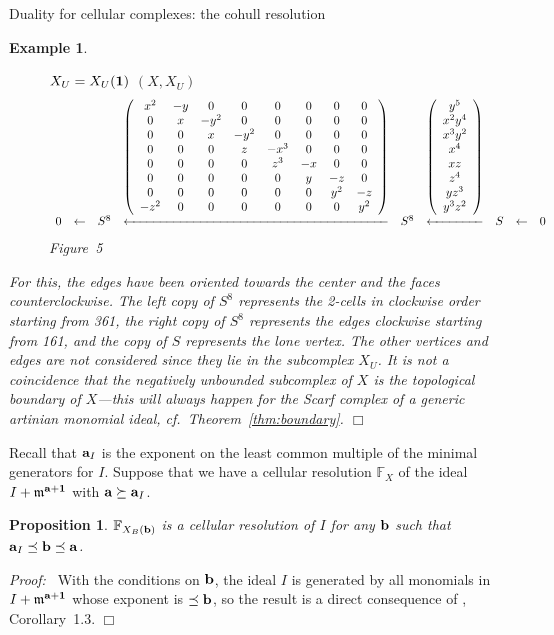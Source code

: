 \documentclass[12pt,leqno]{article}
\def\filleftmap{\mathord\leftarrow \mkern-6mu
	\cleaders\hbox{$\mkern-2mu \mathord- \mkern-2mu$}\hfill
	\mkern-6mu \mathord-}
\newtheorem{prop}[thm]{Proposition}
\newtheorem{example}[thm]{Example}
\def\aa{{{\rm \bf a}}}
\def\bb{{{\rm \bf b}}}
\def\mm{{\mathfrak m}}
\def\FF{{\mathbb F}}
\begin{document}
\begin{section}{Duality for cellular complexes: the cohull resolution}
\begin{example}
\begin{figure}[!htb]
$X_U = X_U({\bf 1})$ \hskip 3in $(X,X_U)$\\
$$
\begin{array}{ccccccccc} \scriptstyle
    &&&
	\left(\begin{array}{cccccccc}
		 x^2 & -y &   0  &   0  &   0  &  0  &  0  &  0  \cr
		  0  &  x & -y^2 &   0  &   0  &  0  &  0  &  0  \cr
		  0  &  0 &   x  & -y^2 &   0  &  0  &  0  &  0  \cr
		  0  &  0 &   0  &   z  & -x^3 &  0  &  0  &  0  \cr
		  0  &  0 &   0  &   0  &  z^3 & -x  &  0  &  0  \cr
		  0  &  0 &   0  &   0  &   0  &  y  & -z  &  0  \cr
		  0  &  0 &   0  &   0  &   0  &  0  & y^2 & -z  \cr
		-z^2 &  0 &   0  &   0  &   0  &  0  &  0  & y^2 \cr
	\end{array}\right) 
    &&
	\left(\begin{array}{c}
		y^5	\cr
		x^2y^4	\cr
		x^3y^2	\cr
		x^4	\cr
		xz	\cr
		z^4	\cr
		yz^3	\cr
		y^3z^2	\cr
	\end{array}\right)
    & 
    \cr
0 & \leftarrow & S^8 & \filleftmap & S^8 & \filleftmap & S & \leftarrow &
	0 \cr
\end{array}
$$
Figure~5
\end{figure}
For this, the edges have been oriented towards the center and the faces
counterclockwise.  The left copy of $S^8$ represents the 2-cells in
clockwise order starting from 361, the right copy of $S^8$ represents the
edges clockwise starting from 161, and the copy of $S$ represents the
lone vertex.  The other vertices and edges are not considered since they
lie in the subcomplex $X_U$.  It is not a coincidence that the negatively
unbounded subcomplex of $X$ is the topological boundary of $X$---this
will always happen for the Scarf complex of a generic artinian monomial
ideal, cf.\ Theorem~\ref{thm:boundary}.
%
\hfill
$\Box$
\end{example}

Recall that $\aa_I$ is the exponent on the least common multiple of the
minimal generators for $I$.  Suppose that we have a cellular resolution
$\FF_X$ of the ideal $I + \mm^{\aa + {\bf 1}}$ with $\aa \succeq \aa_I$.
\begin{prop} \label{prop:cellres}
$\FF_{X_B(\bb)}$ is a cellular resolution of $I$ for any $\bb$
such that $\aa_I \preceq \bb \preceq \aa$.
\end{prop}
{\it Proof:\ } With the conditions on $\bb$, the ideal $I$ is generated
by all monomials in $I + \mm^{\aa + {\bf 1}}$ whose exponent is $\preceq
\bb$, so the result is a direct consequence of \cite{BS}, Corollary~1.3.
\hfill $\Box$
\vskip 2mm


\end{section}
\end{document}
